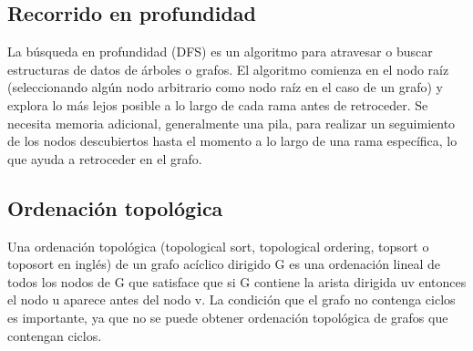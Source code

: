 \subsection{Recorrido en profundidad}
La búsqueda en profundidad (DFS) es un algoritmo para atravesar o buscar estructuras de datos de árboles o grafos. El algoritmo comienza en el nodo raíz (seleccionando algún nodo arbitrario como nodo raíz en el caso de un grafo) y explora lo más lejos posible a lo largo de cada rama antes de retroceder. Se necesita memoria adicional, generalmente una pila, para realizar un seguimiento de los nodos descubiertos hasta el momento a lo largo de una rama específica, lo que ayuda a retroceder en el grafo.

\subsection{Ordenación topológica}
Una ordenación topológica (topological sort, topological ordering, topsort o toposort en inglés) de un grafo acíclico dirigido G es una ordenación lineal de todos los nodos de G que satisface que si G contiene la arista dirigida uv entonces el nodo u aparece antes del nodo v. La condición que el grafo no contenga ciclos es importante, ya que no se puede obtener ordenación topológica de grafos que contengan ciclos. 